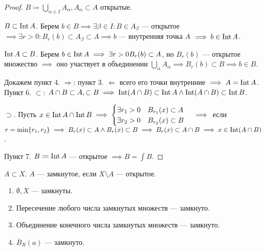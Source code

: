 \begin{proof}
    $B \coloneqq \bigcup_{\alpha \in I} A_{\alpha}, A_\alpha \subset A$ открытые. 

     $B \subset \operatorname{Int} A$. Берем  $b \in B \implies \exists \beta \in I\!: B \in A_\beta$ --- открытое  $\implies \exists r > 0\!: B_r(b) \subset A_\beta \subset A \implies b$ --- внутренняя точка  $A$  $\implies b \in \operatorname{Int} A$.

      $\operatorname{Int} A \subset B$. Берем  $b \in \operatorname{Int} A \implies \exists r > 0 B_r(b) \subset A$, но  $B_r(b)$ --- открытое множество $\implies $ оно участвует в объединении  $\bigcup\limits_\alpha A_\alpha \implies B_r(b) \subset B \implies b \in B$.

      Докажем пункт 4. $\Rightarrow$: пункт 3.  $\Leftarrow$ всего его точки внутренние  $\implies A = \operatorname{Int} A$.
      Пункт 6. $\subset$:  $A \cap B \subset A, \subset B \implies \operatorname{Int}(A \cap B) \subset \operatorname{Int} A \land \operatorname{Int}(A \cap B) \subset \operatorname{Int} B$.

       $\supset$. Пусть $x \in \operatorname{Int} A \cap \operatorname{Int} B \implies \begin{cases} \exists r_1 > 0 \quad B_{r_1}(x) \subset A \\ \exists r_2 > 0 \quad B_{r_2}(x) \subset B \end{cases} \implies$ если $r = \min \{r_1, r_2 \} \implies B_r(x) \subset A \land B_r(x) \subset B \implies B_r(x) \subset A \cap B \implies x \in \operatorname{Int}(A \cap B)$.

       Пункт 7. $B \coloneqq \operatorname{Int} A$ --- открытое $\implies B = \int B$.
\end{proof}
\begin{definition}
    $A \subset X$.  $A$ --- замкнутое, если  $X \setminus A$ --- открытое.
\end{definition}
\begin{theorem}
    \begin{enumerate}
        \item $\emptyset, X$ --- замкнуты.
        \item Пересечение любого числа замкнутых множеств --- замкнуто. 
        \item Объединение конечного числа замкнутых множеств --- замкнуто.
        \item  $\overline{B}_R(a)$ --- замкнуто.
    \end{enumerate}
\end{theorem}
